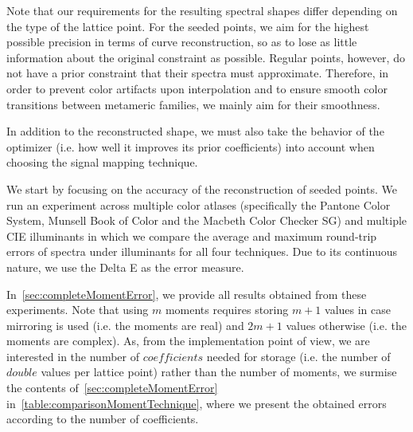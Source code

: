 Note that our requirements for the resulting spectral shapes differ depending on the type of the lattice point. For the seeded points, we aim for the highest possible precision in terms of curve reconstruction, so as to lose as little information about the original constraint as possible. Regular points, however, do not have a prior constraint that their spectra must approximate. Therefore, in order to prevent color artifacts upon interpolation and to ensure smooth color transitions between metameric families, we mainly aim for their smoothness.

In addition to the reconstructed shape, we must also take the behavior of the optimizer (i.e. how well it improves its prior coefficients) into account when choosing the signal mapping technique.

We start by focusing on the accuracy of the reconstruction of seeded points. We run an experiment across multiple color atlases (specifically the Pantone Color System, Munsell Book of Color and the Macbeth Color Checker SG) and multiple CIE illuminants in which we compare the average and maximum round-trip errors of spectra under illuminants for all four techniques. Due to its continuous nature, we use the Delta E as the error measure.

In~\cref{sec:completeMomentError}, we provide all results obtained from these experiments. Note that using $m$ moments requires storing $m+1$ values in case mirroring is used (i.e. the moments are real) and $2m+1$ values otherwise (i.e. the moments are complex). As, from the implementation point of view, we are interested in the number of $coefficients$ needed for storage (i.e. the number of $double$ values per lattice point) rather than the number of moments, we surmise the contents of~\cref{sec:completeMomentError} in~\cref{table:comparisonMomentTechnique}, where we present the obtained errors according to the number of coefficients.

